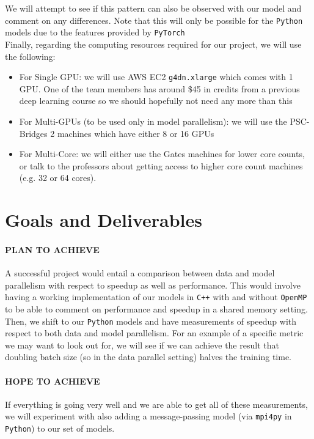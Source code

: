 \documentclass{article}
\begin{document}
We will attempt to see if this pattern can also be observed with our model and comment on any differences. Note that this will only be possible for the \texttt{Python} models due to the features provided by \texttt{PyTorch}\\

\noindent Finally, regarding the computing resources required for our project, we will use the following:

\begin{itemize}
  \item For Single GPU: we will use AWS EC2 \texttt{g4dn.xlarge} which comes with 1 GPU. One of the team members has around \$45 in credits from a previous deep learning course so we should hopefully not need any more than this
  \item For Multi-GPUs (to be used only in model parallelism): we will use the PSC-Bridges 2 machines which have either 8 or 16 GPUs
  \item For Multi-Core: we will either use the Gates machines for lower core counts, or talk to the professors about getting access to higher core count machines (e.g. 32 or 64 cores).
\end{itemize}

\section*{Goals and Deliverables}

\paragraph{PLAN TO ACHIEVE} A successful project would entail a comparison between data and model parallelism with respect to speedup as well as performance. This would involve having a working implementation of our models in \texttt{C++} with and without \texttt{OpenMP} to be able to comment on performance and speedup in a shared memory setting. Then, we shift to our \texttt{Python} models and have measurements of speedup with respect to both data and model parallelism. For an example of a specific metric we may want to look out for, we will see if we can achieve the result that doubling batch size (so in the data parallel setting) halves the training time.

\paragraph{HOPE TO ACHIEVE} If everything is going very well and we are able to get all of these measurements, we will experiment with also adding a message-passing model (via \texttt{mpi4py} in \texttt{Python}) to our set of models.
\end{document}
